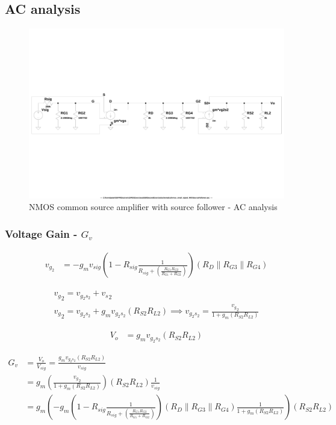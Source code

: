 \documentclass[10pt,a4paper]{book}
\begin{document}
\subsection{AC analysis}

\begin{figure}[h]
  \centering
  \includegraphics[width=17cm]{schematics/nmos_small_signal_WithSourceFollower.jpg}
  \caption{NMOS common source amplifier with source follower - AC analysis}
  \label{SFACpi}
\end{figure}

\subsubsection{Voltage Gain - $G_v$} \label{SFGV}
\begin{align}
v_{g_2} &= -g_m v_{sig} \left(1 - R_{sig} \frac{1}{R_{sig} + \left(\frac{R_{G1}R_{G2}}{R_{G1}+R_{G2}}\right)}\right) \left(R_{D} \parallel R_{G3} \parallel R_{G4}\right)
\end{align}

\begin{align}
{v_g}_2 = v_{{g_2} {s_2}} + {v_s}_2\\
{v_g}_2 = v_{{g_2} {s_2}} + g_m v_{{g_2} {s_2}} (R_{S2} R_{L2}) \implies
v_{{g_2} {s_2}} = \frac{{v_g}_2}{1+g_m(R_{S2} R_{L2})}
\end{align}


\begin{align}
V_o &= g_m v_{g_2 s_2} (R_{S2} R_{L2})
\end{align}

\begin{align}
G_v &= \frac{V_o}{V_{sig}} = \frac{g_m v_{g_2 s_2} (R_{S2} R_{L2})}{v_{sig}}\\
&= g_m \left( \frac{{v_g}_2}{1+g_m(R_{S2} R_{L2})} \right) (R_{S2} R_{L2})\frac{1}{v_{sig}}\\
&= g_m \left( -g_m \left(1 - R_{sig} \frac{1}{R_{sig} + \left(\frac{R_{G1}R_{G2}}{R_{G1}+R_{G2}}\right)}\right) \left(R_{D} \parallel R_{G3} \parallel R_{G4}\right)  \frac{1}{1+g_m(R_{S2} R_{L2})} \right) (R_{S2} R_{L2}) 
\end{align}
\end{document}
